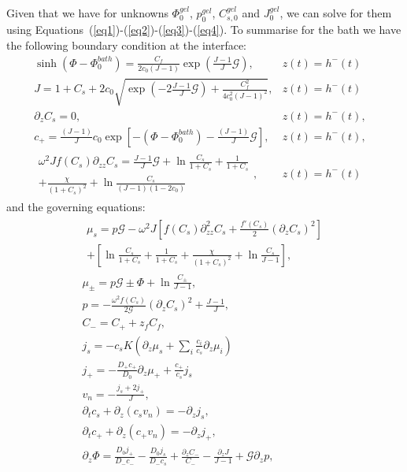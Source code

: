 \documentclass[12pt]{extarticle}
\begin{document}
Given that we have for unknowns $\Phi^{gel}_0$, $p^{gel}_0$, $C^{gel}_{s,0}$ and $J^{gel}_0$, we can solve for them using Equations~(\ref{eq1})-(\ref{eq2})-(\ref{eq3})-(\ref{eq4}). 
To summarise for the bath we have the following boundary condition at the interface:
\begin{eqnarray}
\sinh(\Phi-\Phi_0^{bath})= \frac{C_f}{2c_0 (J-1)}\exp\left(\frac{J-1}{J}\mathcal{G}\right), & z(t)=h^-(t)&\\
J=1+C_{s}+ 2c_0\sqrt{\exp\left(-2\frac{J-1}{J}\mathcal{G}\right)+\frac{C^2_f}{4c^2_0 (J-1)^2}}, & z(t)=h^-(t)&\\[4mm]
\partial_z C_{s}=0,&  z(t)=h^-(t),&\\[5mm]
c_{+} = \frac{(J-1)}{J}c_0\exp\left[-(\Phi-\Phi_0^{bath})-\frac{(J-1)}{J}\mathcal{G}\right], &z(t)=h^-(t),&\\
\begin{aligned}
\omega^2 J f(C_s)\partial_{zz} C_s= \frac{J-1}{J} \mathcal{G}  + \ln \frac{C_s}{1+C_{s}} + \frac{1}{1+C_s}\\+\frac{\chi}{(1+C_{s})^2} + \ln \frac{C_s}{(J-1)(1-2c_0)}
\end{aligned}, & z(t)=h^-(t)&
\end{eqnarray}
and the governing equations:
\begin{gather}
\begin{aligned}
\mu_s = p \mathcal{G}  - \omega^2 J \left[f(C_s)\partial_{zz}^2 C_s+\frac{f'(C_s)}{2}\left(\partial_z C_s\right)^2\right]\\
+ \left[\ln \frac{C_s}{1+C_s} + \frac{1}{1+C_s}+\frac{\chi}{(1+C_s)^2} + \ln \frac{C_s}{J-1} \right], 
\end{aligned}\\[2.5mm]
\mu_\pm = p \mathcal{G} \pm \Phi + \ln \frac{C_\pm}{J-1} ,\\
p=-\frac{\omega^2 f(C_s)}{2\mathcal{G}} (\partial_z C_s)^2+ \frac{J-1}{J},\\
C_- = C_+ + z_f C_f,\\
j_s =-c_sK  \left(\partial_z\mu_s +\sum_i \frac{c_i}{c_s} \partial_z \mu_i\right)\\
j_+= - \frac{D_+ c_+}{D_0}\partial_z \mu_+ + \frac{c_+}{c_s}j_s\\
v_n = - \frac{j_s+2j_+}{J},\\
\partial_t c_s + \partial_z (c_s v_n)=- \partial_z j_s,\\
\partial_t c_+ +\partial_z (c_+ v_n)= -\partial_zj_+,\\
\partial_z \Phi = \frac{D_0 j_+}{D_-c_-}- \frac{D_0 j_s}{D_-c_s} + \frac{\partial_z C_-}{C_-}-\frac{\partial_z J}{J-1}+\mathcal{G}\partial_z p,
\end{gather}
\end{document}

